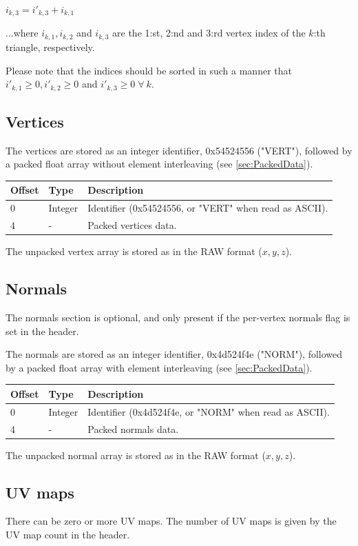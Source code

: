 $i_{k,3} = i'_{k,3} + i_{k,1}$

...where $i_{k,1}, i_{k,2}$ and $i_{k,3}$ are the 1:st, 2:nd and 3:rd vertex index of the
$k$:th triangle, respectively.

Please note that the indices should be sorted in such a manner that
$i'_{k,1} \geq 0, i'_{k,2} \geq 0$ and $i'_{k,3} \geq 0 \; \forall \: k$.

\subsection{Vertices}
The vertices are stored as an integer identifier, 0x54524556 ("VERT"), followed
by a packed float array without element interleaving (see \ref{sec:PackedData}).

\begin{tabular}{|l|l|l|}\hline
\textbf{Offset} &  \textbf{Type} & \textbf{Description}\\ \hline
0 & Integer & Identifier (0x54524556, or "VERT" when read as ASCII).\\ \hline
4 & - & Packed vertices data.\\ \hline
\end{tabular}

The unpacked vertex array is stored as in the RAW format ($x, y, z$).

\subsection{Normals}
The normals section is optional, and only present if the per-vertex normals
flag is set in the header.

The normals are stored as an integer identifier, 0x4d524f4e ("NORM"), followed
by a packed float array with element interleaving (see \ref{sec:PackedData}).

\begin{tabular}{|l|l|l|}\hline
\textbf{Offset} &  \textbf{Type} & \textbf{Description}\\ \hline
0 & Integer & Identifier (0x4d524f4e, or "NORM" when read as ASCII).\\ \hline
4 & - & Packed normals data.\\ \hline
\end{tabular}

The unpacked normal array is stored as in the RAW format ($x, y, z$).

\subsection{UV maps}
There can be zero or more UV maps. The number of UV maps is given by the
UV map count in the header.

